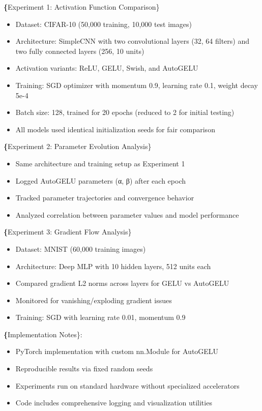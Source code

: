 \documentclass[10pt]{article}
\begin{document}
\textbf\{Experiment 1: Activation Function Comparison\}
\begin{itemize}
\item Dataset: CIFAR-10 (50,000 training, 10,000 test images)
\item Architecture: SimpleCNN with two convolutional layers (32, 64 filters) and two fully connected layers (256, 10 units)
\item Activation variants: ReLU, GELU, Swish, and AutoGELU
\item Training: SGD optimizer with momentum 0.9, learning rate 0.1, weight decay 5e-4
\item Batch size: 128, trained for 20 epochs (reduced to 2 for initial testing)
\item All models used identical initialization seeds for fair comparison
\end{itemize}

\textbf\{Experiment 2: Parameter Evolution Analysis\}
\begin{itemize}
\item Same architecture and training setup as Experiment 1
\item Logged AutoGELU parameters (α, β) after each epoch
\item Tracked parameter trajectories and convergence behavior
\item Analyzed correlation between parameter values and model performance
\end{itemize}

\textbf\{Experiment 3: Gradient Flow Analysis\}
\begin{itemize}
\item Dataset: MNIST (60,000 training images)
\item Architecture: Deep MLP with 10 hidden layers, 512 units each
\item Compared gradient L2 norms across layers for GELU vs AutoGELU
\item Monitored for vanishing/exploding gradient issues
\item Training: SGD with learning rate 0.01, momentum 0.9
\end{itemize}

\textbf\{Implementation Notes\}:
\begin{itemize}
\item PyTorch implementation with custom nn.Module for AutoGELU
\item Reproducible results via fixed random seeds
\item Experiments run on standard hardware without specialized accelerators
\item Code includes comprehensive logging and visualization utilities
\end{itemize}
\end{document}
